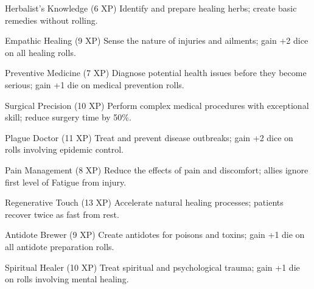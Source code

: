 \documentclass[11pt]{article}
\begin{document}
\begin{talentbox}{Herbalist's Knowledge (6 XP)}
Identify and prepare healing herbs; create basic remedies without rolling.
\end{talentbox}

\begin{talentbox}{Empathic Healing (9 XP)}
Sense the nature of injuries and ailments; gain +2 dice on all healing rolls.
\end{talentbox}

\begin{talentbox}{Preventive Medicine (7 XP)}
Diagnose potential health issues before they become serious; gain +1 die on medical prevention rolls.
\end{talentbox}

\begin{talentbox}{Surgical Precision (10 XP)}
Perform complex medical procedures with exceptional skill; reduce surgery time by 50\%.
\end{talentbox}

\begin{talentbox}{Plague Doctor (11 XP)}
Treat and prevent disease outbreaks; gain +2 dice on rolls involving epidemic control.
\end{talentbox}

\begin{talentbox}{Pain Management (8 XP)}
Reduce the effects of pain and discomfort; allies ignore first level of Fatigue from injury.
\end{talentbox}

\begin{talentbox}{Regenerative Touch (13 XP)}
Accelerate natural healing processes; patients recover twice as fast from rest.
\end{talentbox}

\begin{talentbox}{Antidote Brewer (9 XP)}
Create antidotes for poisons and toxins; gain +1 die on all antidote preparation rolls.
\end{talentbox}

\begin{talentbox}{Spiritual Healer (10 XP)}
Treat spiritual and psychological trauma; gain +1 die on rolls involving mental healing.
\end{talentbox}
\end{document}
